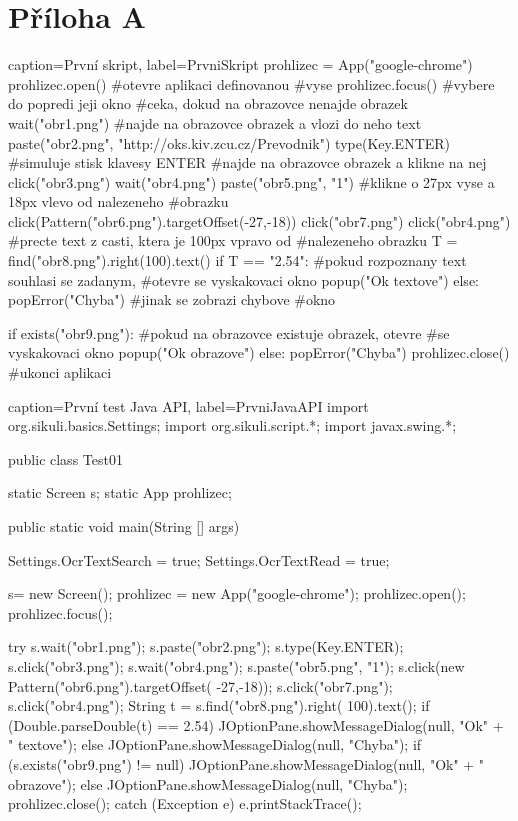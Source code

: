 \chapter*{Příloha A}
	\begin{lstpython}{caption={První skript}, label={PrvniSkript}}
prohlizec = App("google-chrome")
prohlizec.open()	#otevre aplikaci definovanou
				#vyse
prohlizec.focus()	#vybere do popredi jeji okno
#ceka, dokud na obrazovce nenajde obrazek
wait("obr1.png")
#najde na obrazovce obrazek a vlozi do neho text
paste("obr2.png", "http://oks.kiv.zcu.cz/Prevodnik")
type(Key.ENTER)	#simuluje stisk klavesy ENTER
#najde na obrazovce obrazek a klikne na nej
click("obr3.png")
wait("obr4.png")
paste("obr5.png", "1")
#klikne o 27px vyse a 18px vlevo od nalezeneho
#obrazku
click(Pattern("obr6.png").targetOffset(-27,-18))
click("obr7.png")
click("obr4.png")
#precte text z casti, ktera je 100px vpravo od
#nalezeneho obrazku
T = find("obr8.png").right(100).text()
if T == "2.54":
	#pokud rozpoznany text souhlasi se zadanym,
	#otevre se vyskakovaci okno
    popup("Ok textove")
else:
    popError("Chyba")    #jinak se zobrazi chybove
    			 #okno

if exists("obr9.png"):
	#pokud na obrazovce existuje obrazek, otevre
	#se vyskakovaci okno
    popup("Ok obrazove")
else:
    popError("Chyba")
prohlizec.close()    #ukonci aplikaci
	\end{lstpython}

	\begin{lstjava}{caption={První test Java API}, label={PrvniJavaAPI}}
import org.sikuli.basics.Settings;
import org.sikuli.script.*;
import javax.swing.*;

public class Test01 {

  static Screen s;
  static App prohlizec;
  
  public static void main(String [] args) {
    Settings.OcrTextSearch = true;
    Settings.OcrTextRead = true;

    s= new Screen();
    prohlizec = new App("google-chrome");
    prohlizec.open();
    prohlizec.focus();
    
    try {
      s.wait("obr1.png");
      s.paste("obr2.png");
      s.type(Key.ENTER);
      s.click("obr3.png");
      s.wait("obr4.png");
      s.paste("obr5.png", "1");
      s.click(new Pattern("obr6.png").targetOffset(
        -27,-18));
      s.click("obr7.png");
      s.click("obr4.png");
      String t = s.find("obr8.png").right(
        100).text();
      if (Double.parseDouble(t) == 2.54) {
        JOptionPane.showMessageDialog(null, "Ok" +
          " textove");
      } else {
        JOptionPane.showMessageDialog(null, "Chyba");
      }
      if (s.exists("obr9.png") != null) {
        JOptionPane.showMessageDialog(null, "Ok" +
          " obrazove");
      } else {
        JOptionPane.showMessageDialog(null, "Chyba");
      }
      prohlizec.close();
    } catch (Exception e) {
      e.printStackTrace();
    }
  }
}
	\end{lstjava}
	
